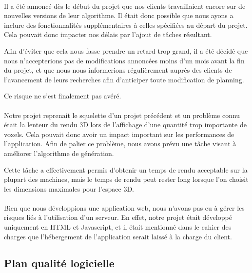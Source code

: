 \documentclass{scrartcl}
\begin{document}
\paragraph{}
Il a été annoncé dès le début du projet que nos clients travaillaient encore sur de nouvelles versions de leur algorithme. Il était donc possible que nous ayons a inclure des fonctionnalités supplémentaires à celles spécifiées au départ du projet. Cela pouvait donc impacter nos délais par l'ajout de tâches résultant. 

Afin d'éviter que cela nous fasse prendre un retard trop grand, il a été décidé que nous n'accepterions pas de modifications annoncées moins d'un mois avant la fin du projet, et que nous nous informerions régulièrement auprès des clients de l'avancement de leurs recherches afin d'anticiper toute modification de planning.

Ce risque ne s'est finalement pas avéré.

\paragraph{}
Notre projet reprenait le squelette d'un projet précédent et un problème connu était la lenteur du rendu 3D lors de l'affichage d'une quantité trop importante de voxels. Cela pouvait donc avoir un impact important sur les performances de l'application. Afin de palier ce problème, nous avons prévu une tâche visant à améliorer l'algorithme de génération.

Cette tâche a effectivement permis d'obtenir un temps de rendu acceptable sur la plupart des machines, mais le temps de rendu peut rester long lorsque l'on choisit les dimensions maximales pour l'espace 3D.

\paragraph{}
Bien que nous développions une application web, nous n'avons pas eu à gérer les risques liés à l'utilisation d'un serveur. En effet, notre projet était développé uniquement en HTML et Javascript, et il était mentionné dans le cahier des charges que l'hébergement de l'application serait laissé à la charge du client.

\subsection{Plan qualité logicielle}
\end{document}

